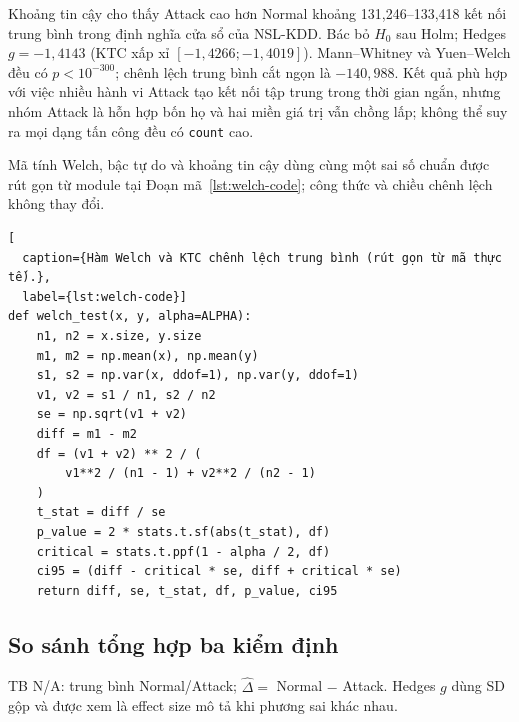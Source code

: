 Khoảng tin cậy cho thấy Attack cao hơn Normal khoảng 131,246--133,418 kết nối trung
bình trong định nghĩa cửa sổ của NSL-KDD. Bác bỏ $H_0$ sau Holm; Hedges
$g=-1{,}4143$ (KTC xấp xỉ $[-1{,}4266;-1{,}4019]$). Mann--Whitney và Yuen--Welch
đều có $p<10^{-300}$; chênh lệch trung bình cắt ngọn là $-140{,}988$. Kết quả phù hợp
với việc nhiều hành vi Attack tạo kết nối tập trung trong thời gian ngắn, nhưng nhóm
Attack là hỗn hợp bốn họ và hai miền giá trị vẫn chồng lấp; không thể suy ra mọi dạng
tấn công đều có \texttt{count} cao.

Mã tính Welch, bậc tự do và khoảng tin cậy dùng cùng một sai số chuẩn được rút gọn từ
module tại Đoạn mã~\ref{lst:welch-code}; công thức và chiều chênh lệch không thay đổi.
\begin{minipage}{\textwidth}
\begin{lstlisting}[
  caption={Hàm Welch và KTC chênh lệch trung bình (rút gọn từ mã thực tế).},
  label={lst:welch-code}]
def welch_test(x, y, alpha=ALPHA):
    n1, n2 = x.size, y.size
    m1, m2 = np.mean(x), np.mean(y)
    s1, s2 = np.var(x, ddof=1), np.var(y, ddof=1)
    v1, v2 = s1 / n1, s2 / n2
    se = np.sqrt(v1 + v2)
    diff = m1 - m2
    df = (v1 + v2) ** 2 / (
        v1**2 / (n1 - 1) + v2**2 / (n2 - 1)
    )
    t_stat = diff / se
    p_value = 2 * stats.t.sf(abs(t_stat), df)
    critical = stats.t.ppf(1 - alpha / 2, df)
    ci95 = (diff - critical * se, diff + critical * se)
    return diff, se, t_stat, df, p_value, ci95
\end{lstlisting}
\end{minipage}

\subsection{So sánh tổng hợp ba kiểm định}
\label{subsec:two-sample-summary}

\begin{table}[H]
\centering
\caption{Tổng hợp ba kiểm định Welch hai mẫu độc lập}
\label{tab:two-sample-summary}
\scriptsize
\setlength{\tabcolsep}{2.5pt}
\par\smallskip
\footnotesize TB N/A: trung bình Normal/Attack; $\widehat\Delta=$ Normal $-$ Attack.
Hedges $g$ dùng SD gộp và được xem là effect size mô tả khi phương sai khác nhau.
\end{table}

